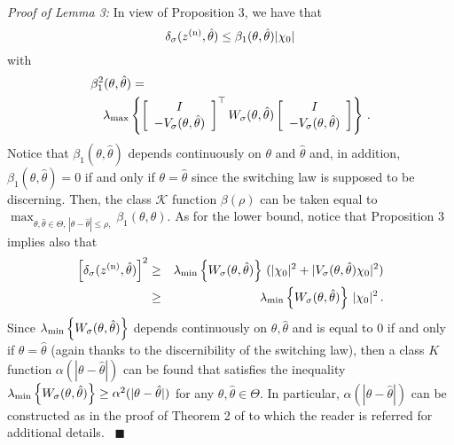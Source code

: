 \documentclass[letterpaper, 10 pt, conference]{ieeetran}
\def\qedp{\hspace*{\fill}~{\tiny $\blacksquare$}}
\begin{document}
{\em Proof of Lemma 3:} 
In view of Proposition 3, we have that
\[
\delta_\sigma(z^{({\rm n})},\hat \theta) \le \beta_1 (\theta, \hat \theta) | \chi_0 |
\]
with
\[
\begin{split}
 &\beta_1^2 (\theta, \hat \theta)  = \\ & \quad \lambda_{\rm max} \left \{ \left [ \begin{array}{c} I \\ - V_\sigma (\theta, \hat \theta) \end{array} \right ]^\top
 W_\sigma (\theta, \hat \theta)  
 \left [ \begin{array}{c} I \\ - V_\sigma (\theta, \hat \theta) \end{array} \right ]  \right \}
\, .
\end{split}
\]
Notice that  $\beta_1 (\theta, \hat \theta) $ depends continuously on $\theta$ and $\hat \theta$ and, in addition, $\beta_1 (\theta, \hat \theta) = 0$
if and only if $\theta = \hat \theta$ since the switching law is supposed to be discerning. Then,
the class $\mathcal K$ function $\beta(\rho)$ can be taken equal to $\max_{\theta, \hat \theta \in \Theta, \, | \theta - \hat \theta| \le \rho , } \beta_1 (\theta, \theta) $.
As for the lower bound, notice that Proposition 3 implies also that
{\setlength\arraycolsep{1pt}
\begin{eqnarray*}
\left [ \delta_\sigma(z^{({\rm n})},\hat \theta) \right ]^2 &\ge& \lambda_{\rm min} \left \{ W_\sigma (\theta,\hat \theta) \right \} \, ( | \chi_ 0|^2 + | V_\sigma (\theta,\hat \theta) \chi_0|^2) 
\\ &\ge& \lambda_{\rm min} \left \{ W_\sigma (\theta,\hat \theta) \right \} \,  | \chi_ 0|^2 \, .
\end{eqnarray*}}Since $ \lambda_{\rm min} \left \{ W_\sigma (\theta,\hat \theta) \right \} $ depends continuously on $\theta,\hat \theta$ and is equal to $0$ if and only if
$\theta = \hat \theta$ (again thanks to the discernibility of the switching law), then a class $K$ function $\alpha (|\theta-\hat \theta|)$ can be found
that satisfies the inequality $\lambda_{\rm min} \left \{ W_\sigma (\theta,\hat \theta) \right \}  \ge \alpha^2 (|\theta-\hat \theta|) $ for any $\theta, \hat \theta \in \Theta$.
In particular, $\alpha (|\theta-\hat \theta|)$ can be constructed as in the proof of Theorem 2 of \cite{AlBaBaTAC} to which the reader is referred for additional details.
\qedp
\end{document}

